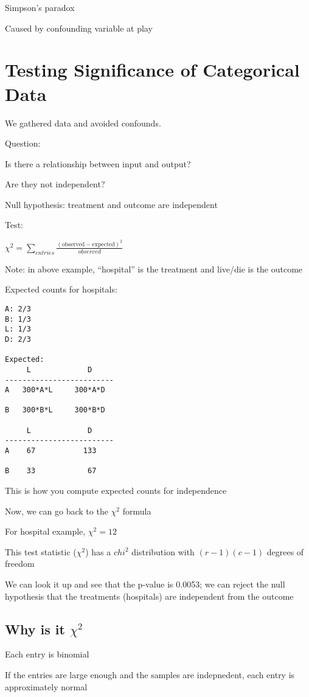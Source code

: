 \documentclass[twoside]{article}
\begin{document}
Simpson's paradox

Caused by confounding variable at play

\section{Testing Significance of Categorical Data}

We gathered data and avoided confounds. 

Question: 

Is there a relationship between input and output?

Are they not independent?

Null hypothesis: treatment and outcome are independent

Test: 

$\chi^2 = \sum\limits_{entries} \frac{(\text{observed} - \text{expected})^2}{observed}$

Note: in above example, ``hospital'' is the treatment and live/die is the outcome

Expected counts for hospitals:

\begin{verbatim}
A: 2/3
B: 1/3
L: 1/3
D: 2/3

Expected:
     L             D
-------------------------
A   300*A*L     300*A*D

B   300*B*L     300*B*D

     L             D
-------------------------
A    67           133

B    33            67
\end{verbatim}

This is how you compute expected counts for independence

Now, we can go back to the $\chi^2$ formula

For hospital example, $\chi^2 = 12$

This test statistic ($\chi^2$) has a $chi^2$ distribution with $(r-1)(c-1)$ degrees of freedom

We can look it up and see that the p-value is 0.0053; we can reject the null hypothesis that the treatments (hospitals) are independent from the outcome

\subsection{Why is it $\chi^2$}

Each entry is binomial

If the entries are large enough and the samples are indepnedent, each entry is approximately normal
\end{document}
